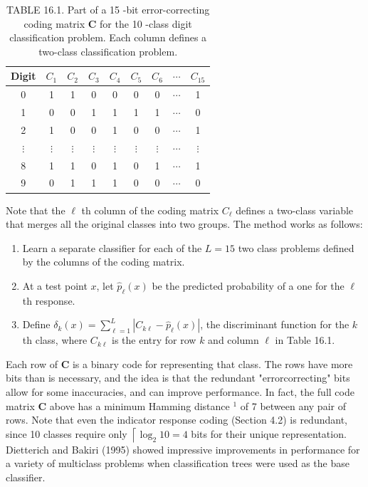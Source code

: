 \documentclass[10pt]{article}
\begin{document}
\begin{table}[h]
\begin{center}
\captionsetup{labelformat=empty}
\caption{TABLE 16.1. Part of a 15 -bit error-correcting coding matrix $\mathbf{C}$ for the 10 -class digit classification problem. Each column defines a two-class classification problem.}
\begin{tabular}{c|cccccccc}
Digit & $C_{1}$ & $C_{2}$ & $C_{3}$ & $C_{4}$ & $C_{5}$ & $C_{6}$ & $\cdots$ & $C_{15}$ \\
\hline
0 & 1 & 1 & 0 & 0 & 0 & 0 & $\cdots$ & 1 \\
1 & 0 & 0 & 1 & 1 & 1 & 1 & $\cdots$ & 0 \\
2 & 1 & 0 & 0 & 1 & 0 & 0 & $\cdots$ & 1 \\
$\vdots$ & $\vdots$ & $\vdots$ & $\vdots$ & $\vdots$ & $\vdots$ & $\vdots$ & $\cdots$ & $\vdots$ \\
8 & 1 & 1 & 0 & 1 & 0 & 1 & $\cdots$ & 1 \\
9 & 0 & 1 & 1 & 1 & 0 & 0 & $\cdots$ & 0 \\
\end{tabular}
\end{center}
\end{table}

Note that the $\ell$ th column of the coding matrix $C_{\ell}$ defines a two-class variable that merges all the original classes into two groups. The method works as follows:

\begin{enumerate}
  \item Learn a separate classifier for each of the $L=15$ two class problems defined by the columns of the coding matrix.
  \item At a test point $x$, let $\hat{p}_{\ell}(x)$ be the predicted probability of a one for the $\ell$ th response.
  \item Define $\delta_{k}(x)=\sum_{\ell=1}^{L}\left|C_{k \ell}-\hat{p}_{\ell}(x)\right|$, the discriminant function for the $k$ th class, where $C_{k \ell}$ is the entry for row $k$ and column $\ell$ in Table 16.1.
\end{enumerate}

Each row of $\mathbf{C}$ is a binary code for representing that class. The rows have more bits than is necessary, and the idea is that the redundant "errorcorrecting" bits allow for some inaccuracies, and can improve performance. In fact, the full code matrix $\mathbf{C}$ above has a minimum Hamming distance ${ }^{1}$ of 7 between any pair of rows. Note that even the indicator response coding (Section 4.2) is redundant, since 10 classes require only $\left\lceil\log _{2} 10=4\right.$ bits for their unique representation. Dietterich and Bakiri (1995) showed impressive improvements in performance for a variety of multiclass problems when classification trees were used as the base classifier.
\end{document}
